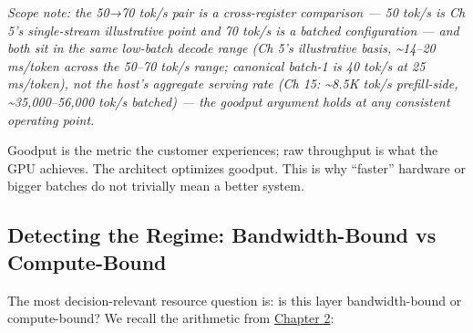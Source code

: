 \emph{Scope note: the 50→70 tok/s pair is a cross-register comparison
--- 50 tok/s is Ch 5's single-stream illustrative point and 70 tok/s is
a batched configuration --- and both sit in the same low-batch decode
range (Ch 5's illustrative basis, \textasciitilde14--20 ms/token across
the 50--70 tok/s range; canonical batch-1 is 40 tok/s at 25 ms/token),
not the host's aggregate serving rate (Ch 15: \textasciitilde8.5K tok/s
prefill-side, \textasciitilde35,000--56,000 tok/s batched) --- the
goodput argument holds at any consistent operating point.}

Goodput is the metric the customer experiences; raw throughput is what
the GPU achieves. The architect optimizes goodput. This is why
``faster'' hardware or bigger batches do not trivially mean a better
system.

\subsection{Detecting the Regime: Bandwidth-Bound vs
Compute-Bound}\label{detecting-the-regime-bandwidth-bound-vs-compute-bound}

The most decision-relevant resource question is: is this layer
bandwidth-bound or compute-bound? We recall the arithmetic from \hyperref[chap:2]{Chapter 2}:

